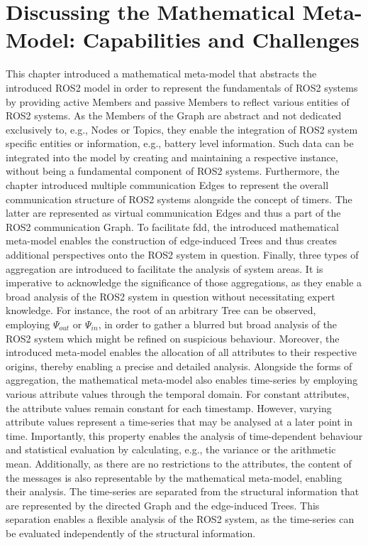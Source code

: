     \section{Discussing the Mathematical Meta-Model: Capabilities and Challenges} \label{sec:mathModel:discussion}
\vspace{-.5cm}
    This chapter introduced a mathematical meta-model that abstracts the introduced ROS2 model in order to represent the fundamentals of ROS2 systems by providing active Members and passive Members to reflect various entities of ROS2 systems. As the Members of the Graph are abstract and not dedicated exclusively to, e.g., Nodes or Topics, they enable the integration of ROS2 system specific entities or information, e.g., battery level information. Such data can be integrated into the model by creating and maintaining a respective instance, without being a fundamental component of ROS2 systems.\newline
    Furthermore, the chapter introduced multiple communication Edges to represent the overall communication structure of ROS2 systems alongside the concept of timers. The latter are represented as virtual communication Edges and thus a part of the ROS2 communication Graph. To facilitate \acl{fdd}, the introduced mathematical meta-model enables the construction of edge-induced Trees and thus creates additional perspectives onto the ROS2 system in question. Finally, three types of aggregation are introduced to facilitate the analysis of system areas. It is imperative to acknowledge the significance of those aggregations, as they enable a broad analysis of the ROS2 system in question without necessitating expert knowledge. For instance, the root of an arbitrary Tree can be observed, employing $\Psi_{out}$ or $\Psi_{in}$, in order to gather a blurred but broad analysis of the ROS2 system which might be refined on suspicious behaviour. Moreover, the introduced meta-model enables the allocation of all attributes to their respective origins, thereby enabling a precise and detailed analysis.\newline
    Alongside the forms of aggregation, the mathematical meta-model also enables time-series by employing various attribute values through the temporal domain. For constant attributes, the attribute values remain constant for each timestamp. However, varying attribute values represent a time-series that may be analysed at a later point in time. Importantly, this property enables the analysis of time-dependent behaviour and statistical evaluation by calculating, e.g., the variance or the arithmetic mean.\newline
    Additionally, as there are no restrictions to the attributes, the content of the messages is also representable by the mathematical meta-model, enabling their analysis.\newline
    The time-series are separated from the structural information that are represented by the directed Graph and the edge-induced Trees. This separation enables a flexible analysis of the ROS2 system, as the time-series can be evaluated independently of the structural information.

